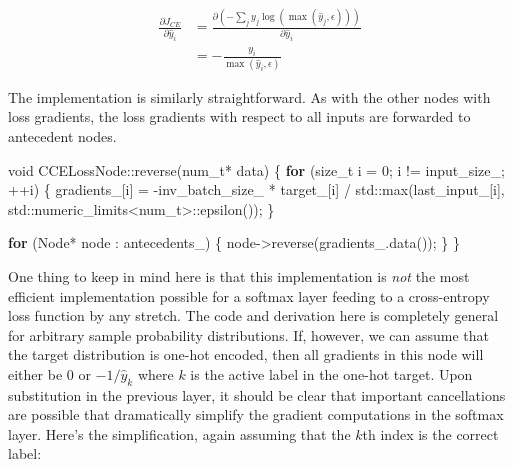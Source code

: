 \documentclass[
]{article}
\newenvironment{Shaded}{}{}
\newcommand{\BuiltInTok}[1]{#1}
\newcommand{\ControlFlowTok}[1]{\textcolor[rgb]{0.00,0.44,0.13}{\textbf{#1}}}
\newcommand{\DataTypeTok}[1]{\textcolor[rgb]{0.56,0.13,0.00}{#1}}
\newcommand{\DecValTok}[1]{\textcolor[rgb]{0.25,0.63,0.44}{#1}}
\newcommand{\NormalTok}[1]{#1}
\newcommand{\VariableTok}[1]{\textcolor[rgb]{0.10,0.09,0.49}{#1}}
\begin{document}
\[
\begin{aligned}
\frac{\partial J_{CE}}{\partial{\hat{y}_i}} &= \frac{\partial \left(-\sum_j y_j\log{\left(\max(\hat{y}_j, \epsilon)\right)}\right)}{\partial \hat{y}_i} \\
&= -\frac{y_i}{\max(\hat{y}_i, \epsilon)}
\end{aligned}
\]

The implementation is similarly straightforward. As with the other nodes
with loss gradients, the loss gradients with respect to all inputs are
forwarded to antecedent nodes.

\begin{Shaded}
\begin{Highlighting}[]
\DataTypeTok{void}\NormalTok{ CCELossNode::reverse(}\DataTypeTok{num\_t}\NormalTok{* data)}
\NormalTok{\{}
    \ControlFlowTok{for}\NormalTok{ (}\DataTypeTok{size\_t}\NormalTok{ i = }\DecValTok{0}\NormalTok{; i != }\VariableTok{input\_size\_}\NormalTok{; ++i)}
\NormalTok{    \{}
        \VariableTok{gradients\_}\NormalTok{[i] = {-}}\VariableTok{inv\_batch\_size\_}\NormalTok{ * }\VariableTok{target\_}\NormalTok{[i]}
\NormalTok{            / }\BuiltInTok{std::}\NormalTok{max(}\VariableTok{last\_input\_}\NormalTok{[i], }\BuiltInTok{std::}\NormalTok{numeric\_limits\textless{}}\DataTypeTok{num\_t}\NormalTok{\textgreater{}::epsilon());}
\NormalTok{    \}}

    \ControlFlowTok{for}\NormalTok{ (Node* node : }\VariableTok{antecedents\_}\NormalTok{)}
\NormalTok{    \{}
\NormalTok{        node{-}\textgreater{}reverse(}\VariableTok{gradients\_}\NormalTok{.data());}
\NormalTok{    \}}
\NormalTok{\}}
\end{Highlighting}
\end{Shaded}

One thing to keep in mind here is that this implementation is \emph{not}
the most efficient implementation possible for a softmax layer feeding
to a cross-entropy loss function by any stretch. The code and derivation
here is completely general for arbitrary sample probability
distributions. If, however, we can assume that the target distribution
is one-hot encoded, then all gradients in this node will either be 0 or
\(-1/\hat{y}_k\) where \(k\) is the active label in the one-hot target.
Upon substitution in the previous layer, it should be clear that
important cancellations are possible that dramatically simplify the
gradient computations in the softmax layer. Here's the simplification,
again assuming that the \(k\)th index is the correct label:
\end{document}
